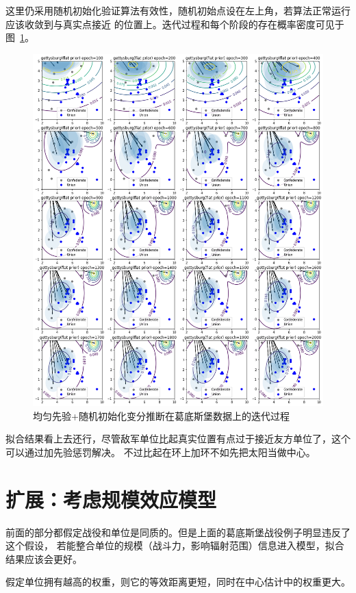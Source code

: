 \documentclass{sicnuthesis}
\begin{document}
这里仍采用随机初始化验证算法有效性，随机初始点设在左上角，若算法正常运行应该收敛到与真实点接近
的位置上。迭代过程和每个阶段的存在概率密度可见于图~\ref{fig:gettysburgInit}。

\begin{figure}[htb]
\includegraphics[width=0.99\linewidth]{gettysburg-init.png}
\caption{
均匀先验+随机初始化变分推断在葛底斯堡数据上的迭代过程}
\label{fig:gettysburgInit}
\end{figure}


拟合结果看上去还行，尽管敌军单位比起真实位置有点过于接近友方单位了，这个可以通过加先验惩罚解决。
不过比起在环上加环不如先把太阳当做中心。

\clearpage
\section{扩展：考虑规模效应模型}


前面的部分都假定战役和单位是同质的。但是上面的葛底斯堡战役例子明显违反了这个假设，
若能整合单位的规模（战斗力，影响辐射范围）信息进入模型，拟合结果应该会更好。

假定单位拥有越高的权重，则它的等效距离更短，同时在中心估计中的权重更大。
\end{document}
